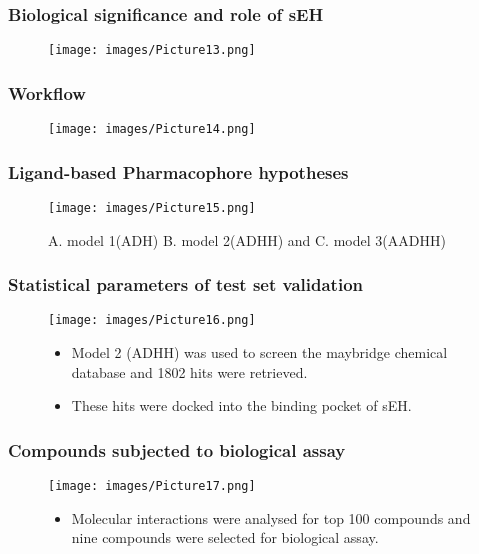\documentclass{beamer}
\begin{document}
\begin{frame}
\frametitle{\textbf{Biological significance and role of sEH}}
\begin{figure}
\texttt{[image: images/Picture13.png]}
\end{figure}
\end{frame}

\begin{frame}
\frametitle{\textbf{Workflow}}
\begin{figure}
\texttt{[image: images/Picture14.png]}
\end{figure}
\end{frame}

\begin{frame}
\frametitle{\textbf{Ligand-based Pharmacophore hypotheses}}
\begin{figure}
\texttt{[image: images/Picture15.png]}
\caption{A. model 1(ADH) B. model 2(ADHH)  and C. model 3(AADHH)}
\end{figure}
\end{frame}

\begin{frame}
\frametitle{\textbf{Statistical parameters of test set validation}}
\begin{figure}
\texttt{[image: images/Picture16.png]}
\begin{itemize}
\item Model 2 (ADHH) was used to screen the maybridge chemical database and 1802 hits were retrieved.
\item These hits were docked into the binding pocket of sEH.
\end{itemize}
\end{figure}
\end{frame}

\begin{frame}
\frametitle{\textbf{Compounds subjected to biological assay}}
\begin{figure}
\texttt{[image: images/Picture17.png]}
\begin{itemize}
\item Molecular interactions were analysed for top 100 compounds and nine compounds were selected for biological assay.
\end{itemize}
\end{figure}
\end{frame}
\end{document}
